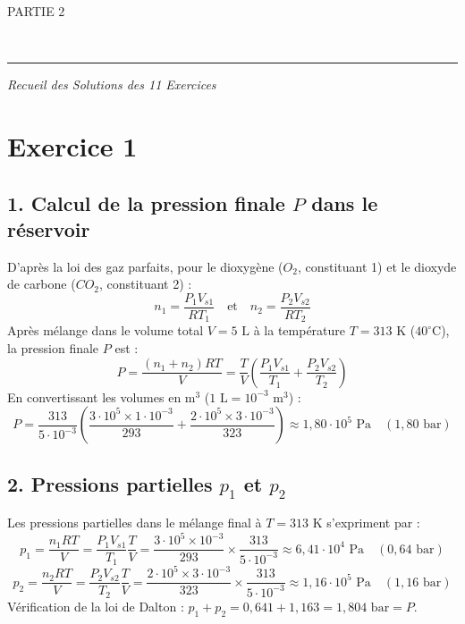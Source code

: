 \documentclass[a4paper,12pt]{article}
\begin{document}
	\newpage 
	
 \centering	\Huge PARTIE 2  
 
 \vspace{5cm}
 
    \\ 
 
 \newpage 
   
 
 	\hrule
 	\vspace{0.4cm}
 	
 
 		\large \textit{Recueil des Solutions des 11 Exercices}
 	
 	\vspace{0.5cm}
 	
 	\section*{Exercice 1 }
 	\subsection*{1. Calcul de la pression finale $P$ dans le réservoir}
 	D'après la loi des gaz parfaits, pour le dioxygène ($O_2$, constituant 1) et le dioxyde de carbone ($CO_2$, constituant 2) :
 	\[ n_1 = \frac{P_1 V_{s1}}{R T_1} \quad \text{et} \quad n_2 = \frac{P_2 V_{s2}}{R T_2} \]
 	Après mélange dans le volume total $V = 5\text{ L}$ à la température $T = 313\text{ K}$ ($40^\circ\text{C}$), la pression finale $P$ est :
 	\[ P = \frac{(n_1 + n_2)RT}{V} = \frac{T}{V} \left( \frac{P_1 V_{s1}}{T_1} + \frac{P_2 V_{s2}}{T_2} \right) \]
 	En convertissant les volumes en $\text{m}^3$ ($1\text{ L} = 10^{-3}\text{ m}^3$) :
 	\[ P = \frac{313}{5 \cdot 10^{-3}} \left( \frac{3 \cdot 10^5 \times 1 \cdot 10^{-3}}{293} + \frac{2 \cdot 10^5 \times 3 \cdot 10^{-3}}{323} \right) \approx 1,80 \cdot 10^5\text{ Pa} \quad (1,80\text{ bar}) \]
 	
 	\subsection*{2. Pressions partielles $p_1$ et $p_2$}
 	Les pressions partielles dans le mélange final à $T = 313\text{ K}$ s'expriment par :
 	\[ p_1 = \frac{n_1 RT}{V} = \frac{P_1 V_{s1}}{T_1} \frac{T}{V} = \frac{3 \cdot 10^5 \times 10^{-3}}{293} \times \frac{313}{5 \cdot 10^{-3}} \approx 6,41 \cdot 10^4\text{ Pa} \quad (0,64\text{ bar}) \]
 	\[ p_2 = \frac{n_2 RT}{V} = \frac{P_2 V_{s2}}{T_2} \frac{T}{V} = \frac{2 \cdot 10^5 \times 3 \cdot 10^{-3}}{323} \times \frac{313}{5 \cdot 10^{-3}} \approx 1,16 \cdot 10^5\text{ Pa} \quad (1,16\text{ bar}) \]
 	Vérification de la loi de Dalton : $p_1 + p_2 = 0,641 + 1,163 = 1,804\text{ bar} = P$.
 	
\end{document}
